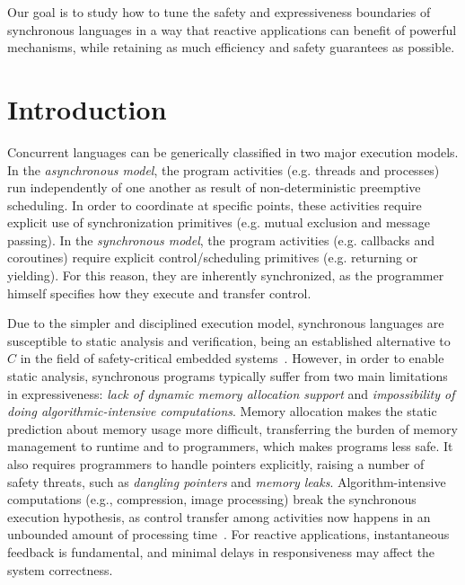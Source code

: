 \documentclass[pdftex,12pt,a4paper]{article}
\begin{document}
Our goal is to study how to tune the safety and expressiveness boundaries of
synchronous languages in a way that reactive applications can benefit of 
powerful mechanisms, while retaining as much efficiency and safety guarantees 
as possible.

\section{Introduction}

Concurrent languages can be generically classified in two major execution 
models.
%
In the \emph{asynchronous model}, the program activities (e.g. threads and 
processes) run independently of one another as result of non-deterministic 
preemptive scheduling.
In order to coordinate at specific points, these activities require explicit 
use of synchronization primitives (e.g. mutual exclusion and message passing).
%
In the \emph{synchronous model}, the program activities (e.g. callbacks and 
coroutines) require explicit control/scheduling primitives (e.g. returning or 
yielding).
For this reason, they are inherently synchronized, as the programmer himself 
specifies how they execute and transfer control.

Due to the simpler and disciplined execution model, synchronous languages are 
susceptible to static analysis and verification, being an established 
alternative to $C$ in the field of safety-critical embedded 
systems~\cite{rp.twelve}.
%
However, in order to enable static analysis, synchronous programs typically 
suffer from two main limitations in expressiveness:
\emph{lack of dynamic memory allocation support} and
\emph{impossibility of doing algorithmic-intensive computations}.
%
Memory allocation makes the static prediction about memory usage more 
difficult, transferring the burden of memory management to runtime and to 
programmers, which makes programs less safe.
It also requires programmers to handle pointers explicitly, raising a number of 
safety threats, such as \emph{dangling pointers} and \emph{memory leaks}.
%
%
Algorithm-intensive computations (e.g., compression, image processing) break 
the synchronous execution hypothesis, as control transfer among activities now 
happens in an unbounded amount of processing time~\cite{rp.hypothesis}.
%
For reactive applications, instantaneous feedback is fundamental, and minimal 
delays in responsiveness may affect the system correctness.
\end{document}
